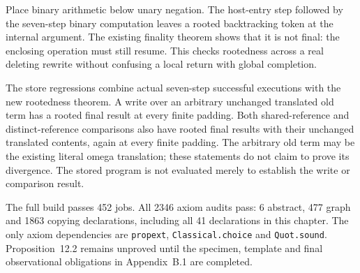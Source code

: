 
Place binary arithmetic below unary negation. The host-entry step followed
by the seven-step binary computation leaves a rooted backtracking token at the
internal argument. The existing finality theorem shows that it is not final:
the enclosing operation must still resume. This checks rootedness across a
real deleting rewrite without confusing a local return with global completion.



The store regressions combine actual seven-step successful executions with
the new rootedness theorem. A write over an arbitrary unchanged translated old
term has a rooted final result at every finite padding. Both shared-reference
and distinct-reference comparisons also have rooted final results with their
unchanged translated contents, again at every finite padding. The arbitrary
old term may be the existing literal omega translation; these statements do
not claim to prove its divergence. The stored program is not evaluated merely
to establish the write or comparison result.



The full build passes 452 jobs. All 2346 axiom audits pass: 6 abstract,
477 graph and 1863 copying declarations, including all 41 declarations in this
chapter. The only axiom dependencies are \texttt{propext},
\texttt{Classical.choice} and \texttt{Quot.sound}. Proposition~12.2 remains
unproved until the specimen, template and final observational obligations in
Appendix~B.1 are completed.
